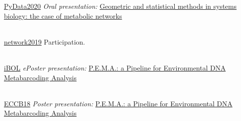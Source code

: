 \documentclass[
    a4paper,
]{fortysecondscv}
\begin{document}
\begin{cvtable}
        {\href{https://pydata.org/global2020/}{PyData2020}}
        {\textit{Oral presentation:} \href{https://www.youtube.com/watch?v=zg8KFZ_LbHM&t=1s}{Geometric and statistical methods in systems biology: the case of metabolic networks}}{}

    \\

        {\href{https://network2019.sciencesconf.org}{network2019}}
        {Participation.}{}

    \\
    
        {\href{http://dnabarcodes2019.org/}{iBOL}}
        {\textit{ePoster presentation:} \href{}{P.E.M.A.: a Pipeline for Environmental DNA Metabarcoding Analysis}}{}

    \\

        {\href{https://www.iscb.org/cms_addon/events/details.php?uid=2508}{ECCB18}}
        {\textit{Poster presentation:} \href{}{P.E.M.A.: a Pipeline for Environmental DNA Metabarcoding Analysis}}{}



\end{cvtable}
\end{document}
